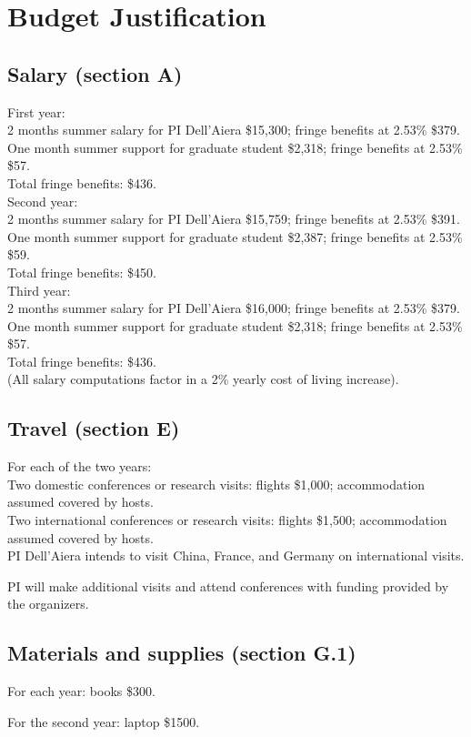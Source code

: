 \documentclass[11pt]{article}
\begin{document}
\section*{Budget Justification}

\subsection*{Salary (section A)}

\noindent  First year:\\
2 months summer salary for PI Dell'Aiera \$15,300; fringe benefits at 2.53\% \$379.\\
One month summer support for graduate student \$2,318; fringe benefits at 2.53\% \$57.\\
Total fringe benefits: \$436.\\

\noindent Second year:\\
2 months summer salary for PI Dell'Aiera \$15,759; fringe benefits at 2.53\% \$391.\\
One month summer support for graduate student \$2,387; fringe benefits at 2.53\% \$59.\\
Total fringe benefits: \$450.\\

\noindent  Third year:\\
2 months summer salary for PI Dell'Aiera \$16,000; fringe benefits at 2.53\% \$379.\\
One month summer support for graduate student \$2,318; fringe benefits at 2.53\% \$57.\\
Total fringe benefits: \$436.\\

\noindent (All salary computations factor in a 2\% yearly cost of living increase).

\subsection*{Travel (section E)}

For each of the two years:\\

\noindent Two domestic conferences or research visits: flights \$1,000; accommodation assumed covered by hosts.\\  

\noindent Two international conferences or research visits: flights \$1,500; accommodation assumed covered by hosts.\\ 

\noindent PI Dell'Aiera intends to visit China, France, and Germany on international visits.

\noindent PI will make additional visits and attend conferences with funding provided by the organizers.

\subsection*{Materials and supplies (section G.1)}

For each year: books \$300.

\noindent For the second year: laptop \$1500.
\end{document}

